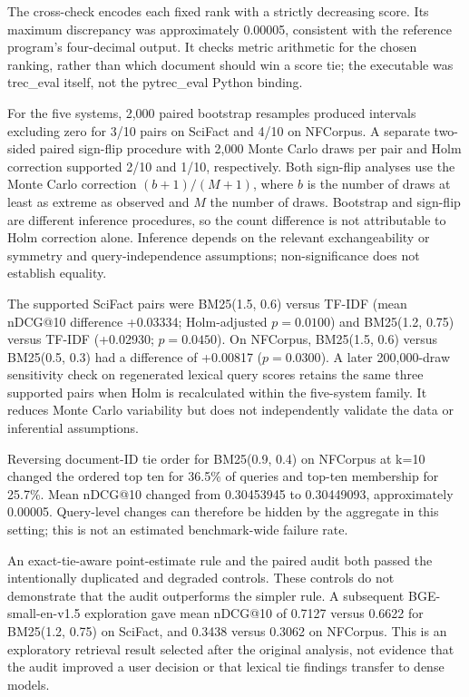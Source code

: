 \documentclass[conference]{IEEEtran}
\begin{document}
The cross-check encodes each fixed rank with a strictly decreasing
score. Its maximum discrepancy was approximately 0.00005, consistent
with the reference program's four-decimal output. It checks metric
arithmetic for the chosen ranking, rather than which document should win
a score tie; the executable was trec\_eval itself, not the pytrec\_eval
Python binding.

For the five systems, 2,000 paired bootstrap resamples produced
intervals excluding zero for 3/10 pairs on SciFact and 4/10 on NFCorpus.
A separate two-sided paired sign-flip procedure with 2,000 Monte Carlo
draws per pair and Holm correction supported 2/10 and 1/10,
respectively. Both sign-flip analyses use the Monte Carlo correction
\((b+1)/(M+1)\), where \(b\) is the number of draws at least as extreme
as observed and \(M\) the number of draws. Bootstrap and sign-flip are
different inference procedures, so the count difference is not
attributable to Holm correction alone. Inference depends on the relevant
exchangeability or symmetry and query-independence assumptions;
non-significance does not establish equality.

The supported SciFact pairs were BM25(1.5, 0.6) versus TF-IDF (mean
nDCG@10 difference +0.03334; Holm-adjusted \(p = 0.0100\)) and BM25(1.2,
0.75) versus TF-IDF (+0.02930; \(p = 0.0450\)). On NFCorpus, BM25(1.5,
0.6) versus BM25(0.5, 0.3) had a difference of +0.00817
(\(p = 0.0300\)). A later 200,000-draw sensitivity check on regenerated
lexical query scores retains the same three supported pairs when Holm is
recalculated within the five-system family. It reduces Monte Carlo
variability but does not independently validate the data or inferential
assumptions.

Reversing document-ID tie order for BM25(0.9, 0.4) on NFCorpus at k=10
changed the ordered top ten for 36.5\% of queries and top-ten membership
for 25.7\%. Mean nDCG@10 changed from 0.30453945 to 0.30449093,
approximately 0.00005. Query-level changes can therefore be hidden by
the aggregate in this setting; this is not an estimated benchmark-wide
failure rate.

An exact-tie-aware point-estimate rule and the paired audit both passed
the intentionally duplicated and degraded controls. These controls do
not demonstrate that the audit outperforms the simpler rule. A
subsequent BGE-small-en-v1.5 \cite{r11} exploration gave mean nDCG@10 of
0.7127 versus 0.6622 for BM25(1.2, 0.75) on SciFact, and 0.3438 versus
0.3062 on NFCorpus. This is an exploratory retrieval result selected
after the original analysis, not evidence that the audit improved a user
decision or that lexical tie findings transfer to dense models.
\end{document}
